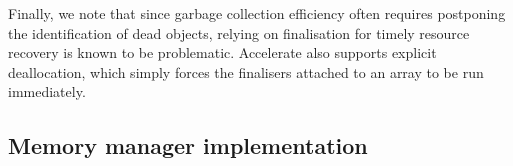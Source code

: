 Finally, we note that since garbage collection efficiency often requires
postponing the identification of dead objects, relying on finalisation for
timely resource recovery is known to be problematic. Accelerate also supports
explicit deallocation, which simply forces the finalisers attached to an array
to be run immediately.

\subsection{Memory manager implementation}
\label{sec:memory_manager_implementation}


%
%
%


